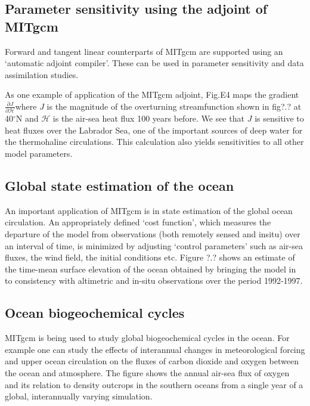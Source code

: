\documentclass[12pt]{book}
\begin{document}

\subsection{Parameter sensitivity using the adjoint of MITgcm}

Forward and tangent linear counterparts of MITgcm are supported using an
`automatic adjoint compiler'. These can be used in parameter sensitivity and
data assimilation studies.

As one example of application of the MITgcm adjoint, Fig.E4 maps the
gradient $\frac{\partial J}{\partial \mathcal{H}}$where $J$ is the magnitude
of the overturning streamfunction shown in fig?.? at 40$^{\circ }$N and $
\mathcal{H}$ is the air-sea heat flux 100 years before. We see that $J$ is
sensitive to heat fluxes over the Labrador Sea, one of the important sources
of deep water for the thermohaline circulations. This calculation also
yields sensitivities to all other model parameters.


\subsection{Global state estimation of the ocean}

An important application of MITgcm is in state estimation of the global
ocean circulation. An appropriately defined `cost function', which measures
the departure of the model from observations (both remotely sensed and
insitu) over an interval of time, is minimized by adjusting `control
parameters' such as air-sea fluxes, the wind field, the initial conditions
etc. Figure ?.? shows an estimate of the time-mean surface elevation of the
ocean obtained by bringing the model in to consistency with altimetric and
in-situ observations over the period 1992-1997.


\subsection{Ocean biogeochemical cycles}

MITgcm is being used to study global biogeochemical cycles in the ocean. For
example one can study the effects of interannual changes in meteorological
forcing and upper ocean circulation on the fluxes of carbon dioxide and
oxygen between the ocean and atmosphere. The figure shows the annual air-sea
flux of oxygen and its relation to density outcrops in the southern oceans
from a single year of a global, interannually varying simulation.
\end{document}
